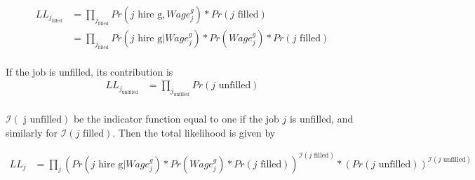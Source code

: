 \documentclass[11pt]{article}
\begin{document}
\begin{align*}
 LL_{j_{\text{filled}}} &= \prod_{j_{\text{filled}}}  Pr(\text{$j$ hire g},Wage^g_{j})*Pr(\text{$j$ filled}) \\
  &=  \prod_{j_{\text{filled}}}  Pr(\text{$j$ hire g} | Wage^g_{j})*Pr(Wage^g_{j})*Pr( \text{$j$ filled}) \\
\end{align*}

If the job is unfilled, its contribution is
\begin{align*}
 LL_{j_{\text{unfilled}}} &= \prod_{j_{\text{unfilled}}}  Pr(\text{$j$ unfilled}) \\
\end{align*}

$\mathcal{I}( \text{ j unfilled})$ be the indicator function equal to one if the job $j$ is unfilled, and similarly for $\mathcal{I}(\text{$j$ filled})$. Then the total likelihood is given by

\begin{align*}
LL_j  &=  \prod_j ( Pr(\text{$j$ hire g} | Wage^g_{j})*Pr(Wage^g_{j})*Pr( \text{$j$ filled}))^{\mathcal{I}(\text{$j$ filled})}*(Pr(\text{$j$ unfilled}))^{\mathcal{I}(\text{$j$ unfilled})}  \\
\end{align*}






\end{document}
